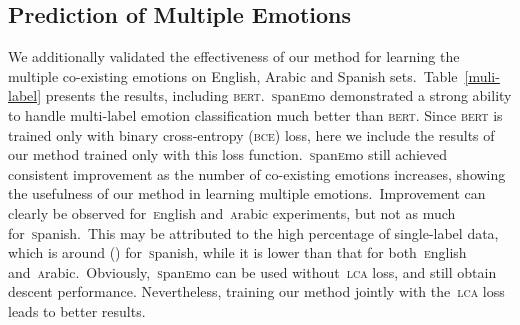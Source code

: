 \documentclass[11pt,a4paper]{article}
\begin{document}
\subsection{Prediction of Multiple Emotions}
We additionally validated the effectiveness of our method for learning the multiple co-existing emotions on English, Arabic and Spanish sets.~Table~\ref{muli-label} presents the results, including \textsc{bert}.~\textsc{s}pan\textsc{e}mo demonstrated a strong ability to handle multi-label emotion classification much better than \textsc{bert}. Since \textsc{bert} is trained only with binary cross-entropy (\textsc{bce}) loss, here we include the results of our method trained only with this loss function.~\textsc{s}pan\textsc{e}mo still achieved consistent improvement as the number of co-existing emotions increases, showing the usefulness of our method in learning multiple emotions.~Improvement can clearly be observed for~\textsc{e}nglish and~\textsc{a}rabic experiments, but not as much for~\textsc{s}panish.~This may be attributed to the high percentage of single-label data, which is around () for~\textsc{s}panish, while it is lower than that for both~\textsc{e}nglish and~\textsc{a}rabic.~Obviously,~\textsc{s}pan\textsc{e}mo can be used without~\textsc{lca} loss, and still obtain descent performance. Nevertheless, training our method jointly with the~\textsc{lca} loss leads to better results.
\end{document}
